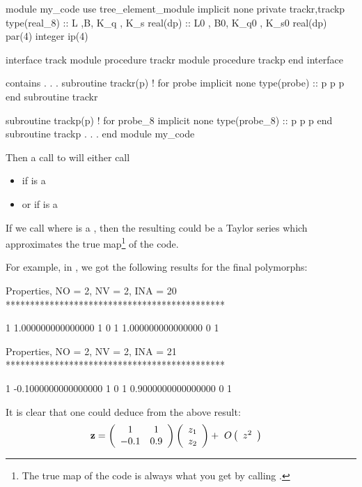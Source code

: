 \documentclass[english,12pt,article]{article} %
\begin{document}
{\begin{code}
  module my_code
  use tree_element_module
  implicit none
  private trackr,trackp
  type(real_8)  :: L ,B, K_q , K_s 
  real(dp) :: L0 , B0, K_q0 , K_s0 
  real(dp) par(4)
  integer ip(4)
      
  interface track
    module procedure trackr
    module procedure trackp 
  end interface

  contains
        .
        .
        .
  subroutine trackr(p) ! for probe
  implicit none
  type(probe) :: p
  p%
  p%
  end subroutine trackr
      
  subroutine trackp(p) ! for probe_8
  implicit none
  type(probe_8) :: p
  p%
  p%
  end subroutine trackp
          .
          .
          .
  end module my_code
\end{code}

Then a call to  will either call    
\begin{itemize} 
  \item {} if  is a 
  \item or  if  is a 
\end{itemize}  
    
If we call   where  is a  , then the resulting  could be a Taylor series which approximates the true map\footnote{The true map of the code is always what you get by calling .} of the code.
    
For example, in , we got the following results for the final polymorphs:
\begin{example1}
 Properties, NO =    2, NV =    2, INA =   20
 *********************************************

   1   1.000000000000000       1  0
   1   1.000000000000000       0  1


 Properties, NO =    2, NV =    2, INA =   21
 *********************************************

   1 -0.1000000000000000       1  0
   1  0.9000000000000000       0  1
\end{example1}

It is clear that one could deduce from the above result:
%
\begin{align} {\bf z}&=\left({\begin{array}{cc}1&1\\
-0.1&0.9\end{array}}\right)\left({\begin{array}{c} {z}_{1} \cr {z}_{2} \end{array}}\right)+\ O\left({\begin{array}{c}{z}^{2}\end{array}}\right) \label{eq:lin1}\end{align}

}
\end{document}
